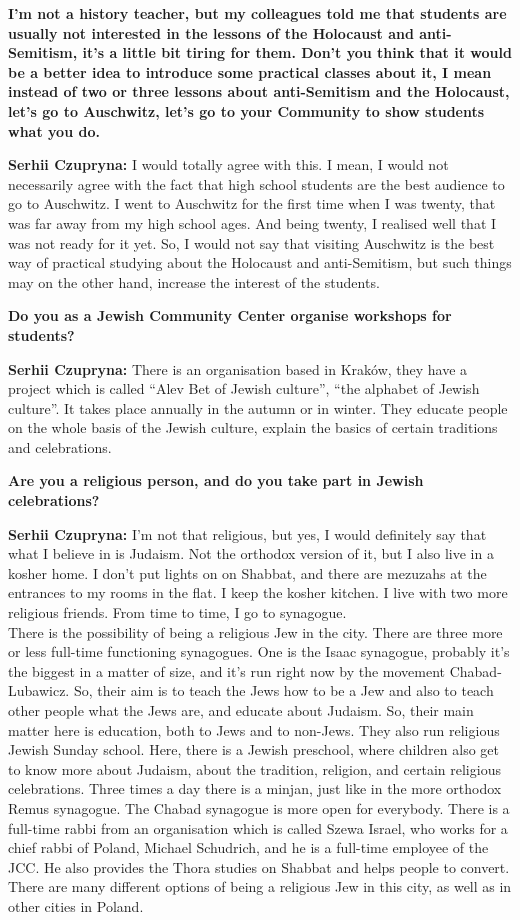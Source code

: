 \textbf{I’m not a history teacher, but my colleagues told me that students are usually not interested in the lessons of the Holocaust and anti-Semitism, it’s a little bit tiring for them. Don’t you think that it would be a better idea to introduce some practical classes about it, I mean instead of two or three lessons about anti-Semitism and the Holocaust, let’s go to Auschwitz, let’s go to your Community to show students what you do.}\par
\textbf{Serhii Czupryna:} I would totally agree with this. I mean, I would not necessarily agree with the fact that high school students are the best audience to go to Auschwitz. I went to Auschwitz for the first time when I was twenty, that was far away from my high school ages. And being twenty, I realised well that I was not ready for it yet. So, I would not say that visiting Auschwitz is the best way of practical studying about the Holocaust and anti-Semitism, but such things may on the other hand, increase the interest of the students.\par  
\textbf{Do you as a Jewish Community Center organise workshops for students?} \par  
\textbf{Serhii Czupryna:} There is an organisation based in Kraków, they have a project which is called ``Alev Bet of Jewish culture'', ``the alphabet of Jewish culture''. It takes place annually in the autumn or in winter. They educate people on the whole basis of the Jewish culture, explain the basics of certain traditions and celebrations.\par 
\textbf{Are you a religious person, and do you take part in Jewish celebrations?} \par
\textbf{Serhii Czupryna:} I’m not that religious, but yes, I would definitely say that what I believe in is Judaism. Not the orthodox version of it, but I also live in a kosher home. I don’t put lights on on Shabbat, and there are mezuzahs at the entrances to my rooms in the flat. I keep the kosher kitchen. I live with two more religious friends. From time to time, I go to synagogue. \\
There is the possibility of being a religious Jew in the city. There are three more or less full-time functioning synagogues. One is the Isaac synagogue, probably it’s the biggest in a matter of size, and it’s run right now by the movement Chabad-Lubawicz. So, their aim is to teach the Jews how to be a Jew and also to teach other people what the Jews are, and educate about Judaism. So, their main matter here is education, both to Jews and to non-Jews. They also run religious Jewish Sunday school. Here, there is a Jewish preschool, where children also get to know more about Judaism, about the tradition, religion, and certain religious celebrations. Three times a day there is a minjan, just like in the more orthodox Remus synagogue. The Chabad synagogue is more open for everybody. There is a full-time rabbi from an organisation which is called Szewa Israel, who works for a chief rabbi of Poland, Michael Schudrich, and he is a full-time employee of the JCC. He also provides the Thora studies on Shabbat and helps people to convert. There are many different options of being a religious Jew in this city, as well as in other cities in Poland.\par  
